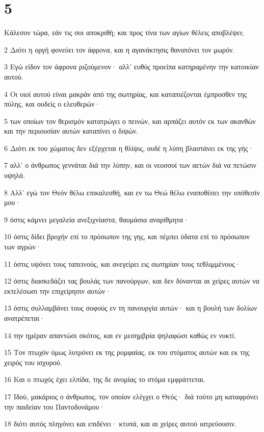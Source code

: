 \chapter{5}

\par Κάλεσον τώρα, εάν τις σοι αποκριθή; και προς τίνα των αγίων θέλεις αποβλέψει;
\par 2 Διότι η οργή φονεύει τον άφρονα, και η αγανάκτησις θανατόνει τον μωρόν.
\par 3 Εγώ είδον τον άφρονα ριζούμενον· αλλ' ευθύς προείπα κατηραμένην την κατοικίαν αυτού.
\par 4 Οι υιοί αυτού είναι μακράν από της σωτηρίας, και καταπιέζονται έμπροσθεν της πύλης, και ουδείς ο ελευθερών·
\par 5 των οποίων τον θερισμόν κατατρώγει ο πεινών, και αρπάζει αυτόν εκ των ακανθών και την περιουσίαν αυτών καταπίνει ο διψών.
\par 6 Διότι εκ του χώματος δεν εξέρχεται η θλίψις, ουδέ η λύπη βλαστάνει εκ της γής·
\par 7 αλλ' ο άνθρωπος γεννάται διά την λύπην, και οι νεοσσοί των αετών διά να πετώσιν υψηλά.
\par 8 Αλλ' εγώ τον Θεόν θέλω επικαλεσθή, και εν τω Θεώ θέλω εναποθέσει την υπόθεσίν μου·
\par 9 όστις κάμνει μεγαλεία ανεξιχνίαστα, θαυμάσια αναρίθμητα·
\par 10 όστις δίδει βροχήν επί το πρόσωπον της γης, και πέμπει ύδατα επί το πρόσωπον των αγρών·
\par 11 όστις υψόνει τους ταπεινούς, και ανεγείρει εις σωτηρίαν τους τεθλιμμένους·
\par 12 όστις διασκεδάζει τας βουλάς των πανούργων, και δεν δύνανται αι χείρες αυτών να εκτελέσωσι την επιχείρησιν αυτών·
\par 13 όστις συλλαμβάνει τους σοφούς εν τη πανουργία αυτών· και η βουλή των δολίων ανατρέπεται·
\par 14 την ημέραν απαντώσι σκότος, και εν μεσημβρία ψηλαφώσι καθώς εν νυκτί.
\par 15 Τον πτωχόν όμως λυτρόνει εκ της ρομφαίας, εκ του στόματος αυτών και εκ της χειρός του ισχυρού.
\par 16 Και ο πτωχός έχει ελπίδα, της δε ανομίας το στόμα εμφράττεται.
\par 17 Ιδού, μακάριος ο άνθρωπος, τον οποίον ελέγχει ο Θεός· διά τούτο μη καταφρόνει την παιδείαν του Παντοδυνάμου·
\par 18 διότι αυτός πληγόνει και επιδένει· κτυπά, και αι χείρες αυτού ιατρεύουσιν.
